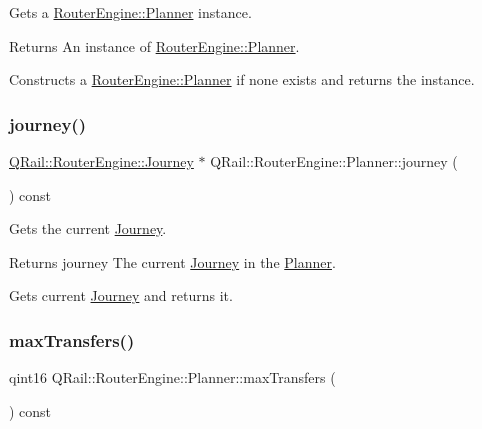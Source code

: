 Gets a \mbox{\hyperlink{classQRail_1_1RouterEngine_1_1Planner}{Router\+Engine\+::\+Planner}} instance. 

\begin{DoxyReturn}{Returns}
An instance of \mbox{\hyperlink{classQRail_1_1RouterEngine_1_1Planner}{Router\+Engine\+::\+Planner}}.
\end{DoxyReturn}
Constructs a \mbox{\hyperlink{classQRail_1_1RouterEngine_1_1Planner}{Router\+Engine\+::\+Planner}} if none exists and returns the instance. \mbox{\label{classQRail_1_1RouterEngine_1_1Planner_af3ae9c83f09d8dadabe6d0e24b22401e}} 
\subsubsection{\texorpdfstring{journey()}{journey()}}
{\footnotesize\ttfamily \mbox{\hyperlink{classQRail_1_1RouterEngine_1_1Journey}{Q\+Rail\+::\+Router\+Engine\+::\+Journey}} $\ast$ Q\+Rail\+::\+Router\+Engine\+::\+Planner\+::journey (\begin{DoxyParamCaption}{ }\end{DoxyParamCaption}) const}



Gets the current \mbox{\hyperlink{classQRail_1_1RouterEngine_1_1Journey}{Journey}}. 

\begin{DoxyReturn}{Returns}
journey The current \mbox{\hyperlink{classQRail_1_1RouterEngine_1_1Journey}{Journey}} in the \mbox{\hyperlink{classQRail_1_1RouterEngine_1_1Planner}{Planner}}.
\end{DoxyReturn}
Gets current \mbox{\hyperlink{classQRail_1_1RouterEngine_1_1Journey}{Journey}} and returns it. \mbox{\label{classQRail_1_1RouterEngine_1_1Planner_ab9a0ae139db0618220d8d069e983c394}} 
\subsubsection{\texorpdfstring{maxTransfers()}{maxTransfers()}}
{\footnotesize\ttfamily qint16 Q\+Rail\+::\+Router\+Engine\+::\+Planner\+::max\+Transfers (\begin{DoxyParamCaption}{ }\end{DoxyParamCaption}) const}



